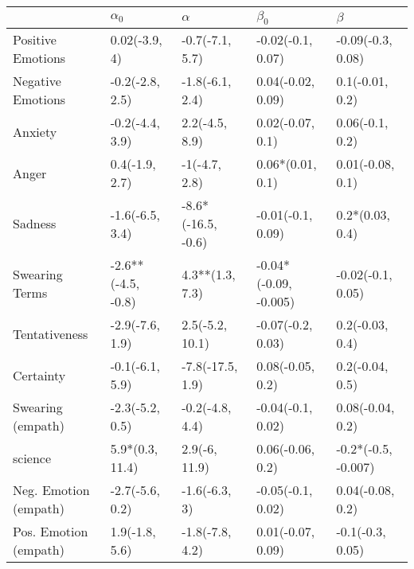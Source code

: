 \begin{tabular}{lllll}
\toprule
{} &          $\alpha_0$ &            $\alpha$ &              $\beta_0$ &              $\beta$ \\
\midrule
Positive Emotions     &       0.02(-3.9, 4) &     -0.7(-7.1, 5.7) &      -0.02(-0.1, 0.07) &    -0.09(-0.3, 0.08) \\
Negative Emotions     &     -0.2(-2.8, 2.5) &     -1.8(-6.1, 2.4) &      0.04(-0.02, 0.09) &      0.1(-0.01, 0.2) \\
Anxiety               &     -0.2(-4.4, 3.9) &      2.2(-4.5, 8.9) &       0.02(-0.07, 0.1) &      0.06(-0.1, 0.2) \\
Anger                 &      0.4(-1.9, 2.7) &       -1(-4.7, 2.8) &       0.06*(0.01, 0.1) &     0.01(-0.08, 0.1) \\
Sadness               &     -1.6(-6.5, 3.4) &  -8.6*(-16.5, -0.6) &      -0.01(-0.1, 0.09) &      0.2*(0.03, 0.4) \\
Swearing Terms        &  -2.6**(-4.5, -0.8) &     4.3**(1.3, 7.3) &  -0.04*(-0.09, -0.005) &    -0.02(-0.1, 0.05) \\
Tentativeness         &     -2.9(-7.6, 1.9) &     2.5(-5.2, 10.1) &      -0.07(-0.2, 0.03) &      0.2(-0.03, 0.4) \\
Certainty             &     -0.1(-6.1, 5.9) &    -7.8(-17.5, 1.9) &       0.08(-0.05, 0.2) &      0.2(-0.04, 0.5) \\
Swearing (empath)     &     -2.3(-5.2, 0.5) &     -0.2(-4.8, 4.4) &      -0.04(-0.1, 0.02) &     0.08(-0.04, 0.2) \\
science               &     5.9*(0.3, 11.4) &       2.9(-6, 11.9) &       0.06(-0.06, 0.2) &  -0.2*(-0.5, -0.007) \\
Neg. Emotion (empath) &     -2.7(-5.6, 0.2) &       -1.6(-6.3, 3) &      -0.05(-0.1, 0.02) &     0.04(-0.08, 0.2) \\
Pos. Emotion (empath) &      1.9(-1.8, 5.6) &     -1.8(-7.8, 4.2) &      0.01(-0.07, 0.09) &     -0.1(-0.3, 0.05) \\
\bottomrule
\end{tabular}
